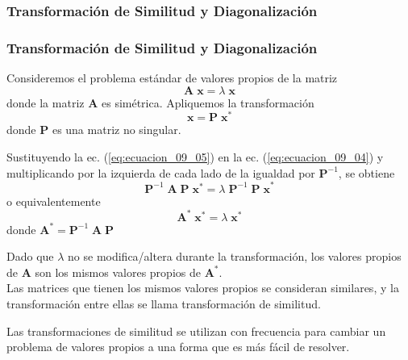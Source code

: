 \subsubsection{Transformación de Similitud y Diagonalización}
\begin{frame}
\frametitle{Transformación de Similitud y Diagonalización}
Consideremos el problema estándar de valores propios de la matriz
\begin{equation}
\mathbf{A \; x} = \lambda \; \mathbf{x}
\label{eq:ecuacion_09_04}
\end{equation}
donde la matriz $\mathbf{A}$ es simétrica. Apliquemos la transformación
\begin{equation}
\mathbf{x} = \mathbf{P \; x^{*}}
\label{eq:ecuacion_09_05}
\end{equation}
donde $\mathbf{P}$ es una matriz no singular.
\end{frame}
\begin{frame}
Sustituyendo la ec. (\ref{eq:ecuacion_09_05}) en la ec. (\ref{eq:ecuacion_09_04}) y multiplicando por la izquierda de cada lado de la igualdad por $\mathbf{P}^{-1}$, se obtiene
\[ \mathbf{P}^{-1} \; \mathbf{A \; P \; x^{*}} = \lambda \; \mathbf{P}^{-1} \; \mathbf{P \; x}^{*} \]
\pause
o equivalentemente
\begin{equation}
\mathbf{A}^{*} \; \mathbf{x}^{*} = \lambda \; \mathbf{x}^{*}
\label{eq:ecuacion_09_06}
\end{equation}
donde $\mathbf{A}^{*} = \mathbf{P}^{-1} \; \mathbf{A \; P}$
\end{frame}
\begin{frame}
Dado que $\lambda$ no se modifica/altera durante la transformación, los valores propios de $\mathbf{A}$ son los mismos valores propios de $\mathbf{A}^{*}$.
\\
\bigskip
Las matrices que tienen los mismos valores propios se consideran similares, y la transformación entre ellas se llama transformación de similitud.
\end{frame}
\begin{frame}
Las transformaciones de similitud se utilizan con frecuencia para cambiar un problema de valores propios a una forma que es más fácil de resolver.
\end{frame}
